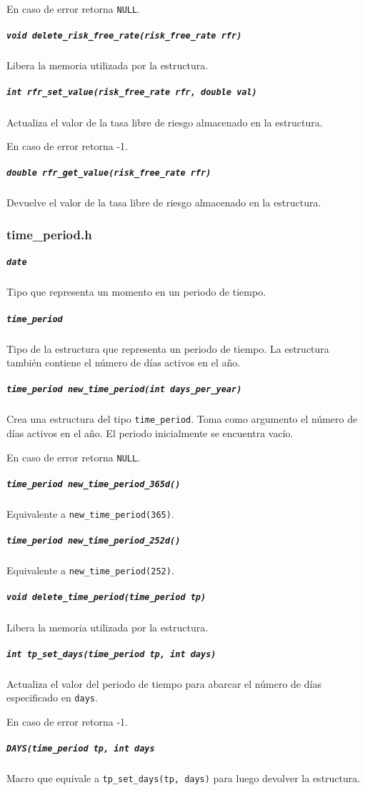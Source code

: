 \documentclass[12pt,a4paper,final]{article}
\begin{document}
				En caso de error retorna \texttt{NULL}.
				
			\subparagraph{\texttt{void delete\_risk\_free\_rate(risk\_free\_rate rfr)}}
				Libera la memoria utilizada por la estructura.
				
			\subparagraph{\texttt{int rfr\_set\_value(risk\_free\_rate rfr, double val)}}
				Actualiza el valor de la tasa libre de riesgo almacenado en la estructura.
				
				En caso de error retorna -1.
				
			\subparagraph{\texttt{double rfr\_get\_value(risk\_free\_rate rfr)}}
				Devuelve el valor de la tasa libre de riesgo almacenado en la estructura.
				
		\subsubsection{time\_period.h}
			
			\subparagraph{\texttt{date}}
				Tipo que representa un momento en un periodo de tiempo.
				
			\subparagraph{\texttt{time\_period}}
				Tipo de la estructura que representa un periodo de tiempo. La estructura
				también contiene el número de días activos en el año.
				
			\subparagraph{\texttt{time\_period new\_time\_period(int days\_per\_year)}}
				Crea una estructura del tipo \texttt{time\_period}. Toma como argumento
				el número de días activos en el año. El periodo inicialmente se encuentra vacío.
				
				En caso de error retorna \texttt{NULL}.
				
			\subparagraph{\texttt{time\_period new\_time\_period\_365d()}}
				Equivalente a \texttt{new\_time\_period(365)}.
				
			\subparagraph{\texttt{time\_period new\_time\_period\_252d()}}
				Equivalente a \texttt{new\_time\_period(252)}.
				
			\subparagraph{\texttt{void delete\_time\_period(time\_period tp)}}
				Libera la memoria utilizada por la estructura.
				
			\subparagraph{\texttt{int tp\_set\_days(time\_period tp, int days)}}
				Actualiza el valor del periodo de tiempo para abarcar el número de días
				especificado en \texttt{days}.
				
				En caso de error retorna -1.
				
			\subparagraph{\texttt{DAYS(time\_period tp, int days}}
				Macro que equivale a \texttt{tp\_set\_days(tp, days)} para luego devolver
				la estructura.
				
\end{document}
